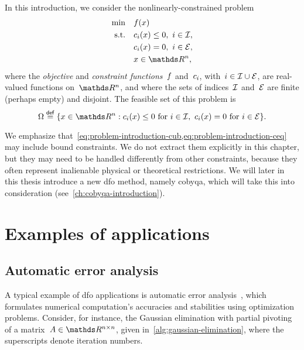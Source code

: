 In this introduction, we consider the nonlinearly-constrained problem
\begin{subequations}
    \label{eq:problem-introduction}
    \begin{align}
        \min        & \quad \obj(x)\\
        \text{s.t.} & \quad \con{i}(x) \le 0, ~ i \in \iub, \label{eq:problem-introduction-cub}\\
                    & \quad \con{i}(x) = 0, ~ i \in \ieq, \label{eq:problem-introduction-ceq}\\
                    & \quad x \in \R^n, \nonumber
    \end{align}
\end{subequations}
where the \emph{objective} and \emph{constraint functions}~$f$ and~$c_{i}$, with~$i \in \mathcal{I} \cup \mathcal{E}$, are real-valued functions on~$\R^n$, and where the sets of indices~$\mathcal{I}$ and~$\mathcal{E}$ are finite (perhaps empty) and disjoint.
The feasible set of this problem is
\begin{equation*}
    \Omega \eqdef \set{x \in \R^n : \con{i}(x) \le 0 ~ \text{for~$i \in \iub$}, ~ \con{i}(x) = 0 ~ \text{for~$i \in \ieq$}}.
\end{equation*}

We emphasize that~\cref{eq:problem-introduction-cub,eq:problem-introduction-ceq} may include bound constraints.
We do not extract them explicitly in this chapter, but they may need to be handled differently from other constraints, because they often represent inalienable physical or theoretical restrictions.
We will later in this thesis introduce a new \gls{dfo} method, namely \gls{cobyqa}, which will take this into consideration (see~\cref{ch:cobyqa-introduction}).

\section{Examples of applications}

\subsection{Automatic error analysis}

A typical example of \gls{dfo} applications is automatic error analysis~\cite{Higham_1993,Higham_2002}, which formulates numerical computation's accuracies and stabilities using optimization problems.
Consider, for instance, the Gaussian elimination with partial pivoting of a matrix~$A \in \R^{n \times n}$, given in~\cref{alg:gaussian-elimination}, where the superscripts denote iteration numbers.

